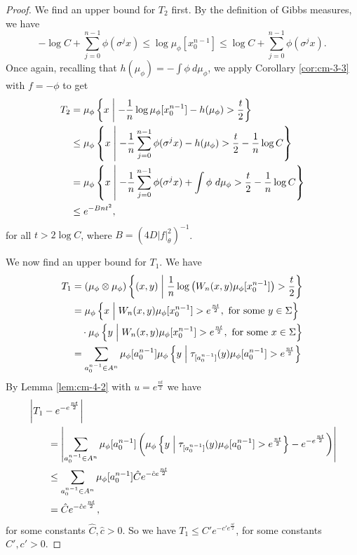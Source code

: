 \begin{theorem}
\begin{proof}
		We find an upper bound for $T_2$ first. By the definition of Gibbs measures, we have
		\begin{equation}\label{fml:gibbs-property}
			-\log{C} + \sum_{j = 0}^{n - 1}{\phi(\sigma^j{x})} \leq \log{\mu_\phi[x_0^{n - 1}]} \leq \log{C} + \sum_{j = 0}^{n - 1}{\phi(\sigma^j{x})}.
		\end{equation}
		Once again, recalling that $h(\mu_\phi) = -\int{\phi\ d\mu_\phi}$, we apply Corollary \ref{cor:cm-3-3} with $f = -\phi$ to get
		\begin{align*}
			T_2 &= \mu_\phi\left\{x \mathrel{}\middle|\mathrel{} - \frac{1}{n}\log{\mu_\phi[x_0^{n - 1}]} - h(\mu_\phi) > \frac{t}{2}\right\} \\
				&\leq \mu_\phi\left\{x \mathrel{}\middle|\mathrel{} -\frac{1}{n}\sum_{j = 0}^{n - 1}{\phi(\sigma^j{x})} -h(\mu_\phi) > \frac{t}{2} -\frac{1}{n}\log{C}\right\} \\
				&= \mu_\phi\left\{x \mathrel{}\middle|\mathrel{} -\frac{1}{n}\sum_{j = 0}^{n - 1}{\phi(\sigma^j{x})} + \int{\phi\ d\mu_\phi} > \frac{t}{2} -\frac{1}{n}\log{C}\right\} \\
				& \leq e^{-Bnt^2},
		\end{align*}
		for all $t > 2\log{C}$, where $B = (4D|f|_\theta^2)^{-1}$.
		
		We now find an upper bound for $T_1$. We have
		\begin{align}
			T_1 &= (\mu_\phi \otimes \mu_\phi)\left\{(x, y) \mathrel{}\middle|\mathrel{} \frac{1}{n}\log\left(W_n(x, y) \mu_\phi[x_0^{n - 1}]\right) > \frac{t}{2}\right\} \\
				&= \mu_\phi\left\{x \mathrel{}\middle|\mathrel{} W_n(x, y) \mu_\phi[x_0^{n - 1}] > e^\frac{nt}{2}, \text{ for some } y \in \Sigma\right\} \nonumber \\
				&\quad \cdot \mu_\phi\left\{y \mathrel{}\middle|\mathrel{} W_n(x, y) \mu_\phi[x_0^{n - 1}] > e^\frac{nt}{2}, \text{ for some } x \in \Sigma\right\} \\
				&= \sum_{a_0^{n - 1} \in A^n}{\mu_\phi[a_0^{n - 1}] \mu_\phi\left\{y \mathrel{}\middle|\mathrel{} \tau_{[a_0^{n - 1}]}(y) \mu_\phi[a_0^{n - 1}] > e^\frac{nt}{2}\right\}}
		\end{align}
		By Lemma \ref{lem:cm-4-2} with $u = e^\frac{nt}{2}$ we have
		\begin{align*}
			&\left|T_1 - e^{-e^\frac{nt}{2}}\right| \\
				& \qquad = \left|\sum_{a_0^{n - 1} \in A^n}\mu_\phi[a_0^{n - 1}]\left(\mu_\phi\left\{y \mathrel{}\middle|\mathrel{} \tau_{[a_0^{n - 1}]}(y) \mu_\phi[a_0^{n - 1}] > e^\frac{nt}{2}\right\} - e^{-e^\frac{nt}{2}}\right)\right| \\
				& \qquad \leq \sum_{a_0^{n - 1} \in A^n}\mu_\phi[a_0^{n - 1}] \hat{C}e^{-\hat{c}e^\frac{nt}{2}} \\
				& \qquad = \hat{C}e^{-\hat{c}e^\frac{nt}{2}},
		\end{align*}
		for some constants $\hat{C}, \hat{c} > 0$. So we have $T_1 \leq C'e^{-c'e^\frac{nt}{2}}$, for some constants $C', c' > 0$.
		

\end{proof}
\end{theorem}
